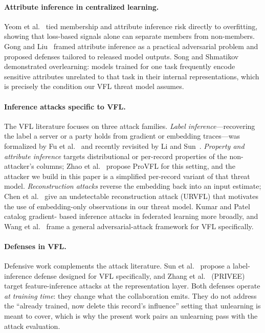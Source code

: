 \documentclass[letterpaper,twocolumn,10pt]{article}
\begin{document}
\paragraph{Attribute inference in centralized learning.}
Yeom et al.~\cite{yeom2018privacy} tied membership and attribute
inference risk directly to overfitting, showing that loss-based signals
alone can separate members from non-members. Gong and
Liu~\cite{gong2018practical} framed attribute inference as a practical
adversarial problem and proposed defenses tailored to released model
outputs. Song and Shmatikov~\cite{song2020overlearning} demonstrated
overlearning: models trained for one task frequently encode sensitive
attributes unrelated to that task in their internal representations,
which is precisely the condition our VFL threat model assumes.

\paragraph{Inference attacks specific to VFL.}
The VFL literature focuses on three attack families. \emph{Label
inference}---recovering the label a server or a party holds from
gradient or embedding traces---was formalized by Fu et
al.~\cite{fu2022label} and recently revisited by Li and
Sun~\cite{li2026revisiting}. \emph{Property and attribute inference}
targets distributional or per-record properties of the non-attacker's
columns; Zhao et al.~\cite{zhao2023provfl} propose ProVFL for this
setting, and the attacker we build in this paper is a simplified
per-record variant of that threat model. \emph{Reconstruction attacks}
reverse the embedding back into an input estimate; Chen et
al.~\cite{chen2025urvfl} give an undetectable reconstruction attack
(URVFL) that motivates the use of embedding-only observations in our
threat model. Kumar and Patel~\cite{kumar2025gradient} catalog gradient-
based inference attacks in federated learning more broadly, and Wang et
al.~\cite{wang2025pgac} frame a general adversarial-attack framework
for VFL specifically.

\paragraph{Defenses in VFL.}
Defensive work complements the attack literature. Sun et
al.~\cite{sun2025defense} propose a label-inference defense designed for
VFL specifically, and Zhang et al.~\cite{zhang2025privee} (PRIVEE)
target feature-inference attacks at the representation layer. Both
defenses operate \emph{at training time}: they change what the
collaboration emits. They do not address the ``already trained, now
delete this record's influence'' setting that unlearning is meant to
cover, which is why the present work pairs an unlearning pass with the
attack evaluation.
\end{document}
